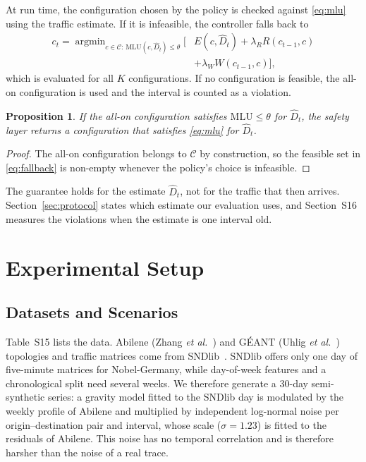 \documentclass[5p,times]{elsarticle}
\newtheorem{proposition}{Proposition}
\begin{document}
At run time, the configuration chosen by the policy is checked against \eqref{eq:mlu} using the traffic estimate. If it is infeasible, the controller falls back to
\begin{equation}\label{eq:fallback}
\begin{split}c_t=\mathop{\arg\min}_{c\in\mathcal{C}:\,\mathrm{MLU}(c,\hat D_t)\le\theta}\Big[&E(c,\hat D_t)+\lambda_R R(c_{t-1},c)\\
&+\lambda_W W(c_{t-1},c)\Big],\end{split}
\end{equation}
which is evaluated for all $K$ configurations. If no configuration is feasible, the all-on configuration is used and the interval is counted as a violation.
\begin{proposition}\label{prop:safety}
If the all-on configuration satisfies $\mathrm{MLU}\le\theta$ for $\hat D_t$, the safety layer returns a configuration that satisfies \eqref{eq:mlu} for $\hat D_t$.
\end{proposition}
\begin{proof}
The all-on configuration belongs to $\mathcal{C}$ by construction, so the feasible set in \eqref{eq:fallback} is non-empty whenever the policy's choice is infeasible.
\end{proof}
The guarantee holds for the estimate $\hat D_t$, not for the traffic that then arrives. Section~\ref{sec:protocol} states which estimate our evaluation uses, and Section~S16 measures the violations when the estimate is one interval old.

\section{Experimental Setup}\label{sec:setup}

\subsection{Datasets and Scenarios}

Table~S15 lists the data. Abilene (Zhang \emph{et al.}~\cite{zhang2003tomogravity}) and G\'{E}ANT (Uhlig \emph{et al.}~\cite{uhlig2006geant}) topologies and traffic matrices come from SNDlib~\cite{orlowski2010sndlib}. SNDlib offers only one day of five-minute matrices for Nobel-Germany, while day-of-week features and a chronological split need several weeks. We therefore generate a 30-day semi-synthetic series: a gravity model fitted to the SNDlib day is modulated by the weekly profile of Abilene and multiplied by independent log-normal noise per origin--destination pair and interval, whose scale ($\sigma=1.23$) is fitted to the residuals of Abilene. This noise has no temporal correlation and is therefore harsher than the noise of a real trace.
\end{document}
